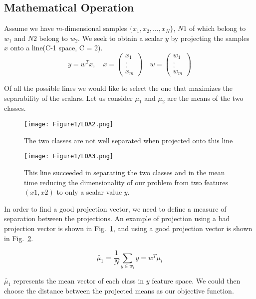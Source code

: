 \subsection{Mathematical Operation}
Assume we have $m$-dimensional samples $\lbrace x_1, x_2,…, x_N\rbrace $, $N1$ of which belong to $w_1$ and $N2$ belong to $w_2$. We seek to obtain a scalar $y$ by projecting the samples $x$ onto a line(C-1 space, C = 2). 
\begin{equation}
y=w^Tx, \quad
x=\left(\begin{array}{c} x_1\\ .\\ .\\ x_m \end{array}\right) \quad
w=\left(\begin{array}{c} w_1\\ .\\ .\\ w_m \end{array}\right)
\end{equation}

Of all the possible lines we would like to select the one that maximizes the separability of the scalars. Let us consider  $\mu_1$ and $\mu_2$ are the means of the two classes.

\begin{figure}
\centering
\texttt{[image: Figure1/LDA2.png]}
\caption{The two classes are not well separated when projected onto this line}
\label{lad2}
\end{figure}

\begin{figure}
\centering
\texttt{[image: Figure1/LDA3.png]}
\caption{This line succeeded in separating the two classes and in the mean time reducing the  dimensionality of our problem from two features $(x1,x2)$ to only a scalar value $y$.}
\label{lad3}
\end{figure}

In order to find a good projection vector, we need to define a measure of separation between the projections. An example of projection using a bad projection vector is shown in Fig.~\ref{lad2}, and using a good projection vector is shown in Fig.~\ref{lad3}.

\begin{equation}
\tilde{\mu_1}= \frac{1}{N}\sum_{y\in w_i}y=w^T\mu_i
\end{equation}

$\tilde{\mu_1}$ represents the mean vector of each class in $y$ feature space. We could then choose the distance between the projected means as our objective function.

